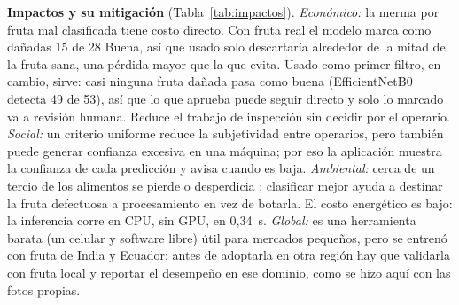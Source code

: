 \documentclass[conference,a4paper]{IEEEtran}
\begin{document}
\textbf{Impactos y su mitigación} (Tabla~\ref{tab:impactos}). \emph{Económico:} la merma por fruta
mal clasificada tiene costo directo. Con fruta real el modelo marca como dañadas 15 de 28 Buena, así
que usado solo descartaría alrededor de la mitad de la fruta sana, una pérdida mayor que la que evita.
Usado como primer filtro, en cambio, sirve: casi ninguna fruta dañada pasa como buena (EfficientNetB0
detecta 49 de 53), así que lo que aprueba puede seguir directo y solo lo marcado va a revisión humana.
Reduce el trabajo de inspección sin decidir por el operario. \emph{Social:} un criterio
uniforme reduce la subjetividad entre operarios, pero también puede generar confianza excesiva en
una máquina; por eso la aplicación muestra la confianza de cada predicción y avisa cuando es baja.
\emph{Ambiental:} cerca de un tercio de los alimentos se pierde o desperdicia \cite{fao2019,unep2021};
clasificar mejor ayuda a destinar la fruta defectuosa a procesamiento en vez de botarla. El costo
energético es bajo: la inferencia corre en CPU, sin GPU, en 0,34~s. \emph{Global:} es una herramienta
barata (un celular y software libre) útil para mercados pequeños, pero se entrenó con fruta de India y
Ecuador; antes de adoptarla en otra región hay que validarla con fruta local y reportar el desempeño
en ese dominio, como se hizo aquí con las fotos propias.
\end{document}
